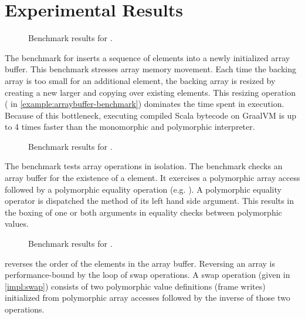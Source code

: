 \section{Experimental Results}

\begin{figure}[!htb]
	\centering
	
	\caption{Benchmark results for .}
\end{figure}

The benchmark for  inserts a sequence of elements into a newly initialized array buffer. 
This benchmark stresses array memory movement.
Each time the backing array is too small for an additional element, the backing array is resized by creating a new larger and copying over existing elements.
This resizing operation ( in \ref{example:arraybuffer-benchmark}) dominates the time spent in execution.
Because of this bottleneck, executing compiled Scala bytecode on GraalVM is up to 4 times faster than the monomorphic and polymorphic interpreter.

\begin{figure}[!htb]
	\centering
	
	\caption{Benchmark results for .}
\end{figure}

The  benchmark tests array operations in isolation. 
The benchmark checks an array buffer for the existence of a element.
It exercises a polymorphic array access followed by a polymorphic equality operation (e.g. ).
A polymorphic equality operator is dispatched the  method of its left hand side argument.
This results in the boxing of one or both arguments in equality checks between polymorphic values.

\begin{figure}[!htb]
	\centering
	
	\caption{Benchmark results for .}
\end{figure}

 reverses the order of the elements in the array buffer.
Reversing an array is performance-bound by the loop of swap operations.
A swap operation (given in \ref{impl:swap}) consists of two polymorphic value definitions (frame writes) initialized from polymorphic array accesses followed by the inverse of those two operations.

